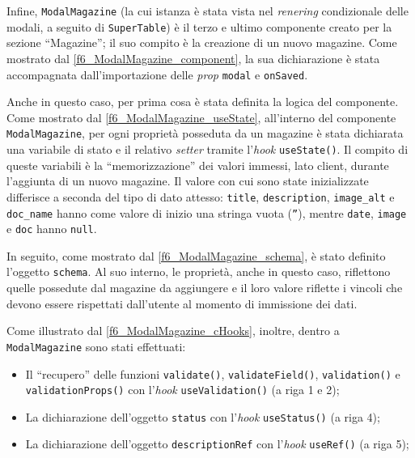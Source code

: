 

Infine, \texttt{ModalMagazine} (la cui istanza è stata vista nel \textit{renering} condizionale delle modali, a seguito di \texttt{SuperTable}) è il terzo e ultimo componente creato per la sezione “Magazine”; il suo compito è la creazione di un nuovo magazine. Come mostrato dal \autoref{f6_ModalMagazine_component}, la sua dichiarazione è stata accompagnata dall'importazione delle \textit{prop} \texttt{modal} e \texttt{onSaved}.


Anche in questo caso, per prima cosa è stata definita la logica del componente. Come mostrato dal \autoref{f6_ModalMagazine_useState}, all'interno del componente \texttt{ModalMagazine}, per ogni proprietà posseduta da un magazine è stata dichiarata una variabile di stato e il relativo \textit{setter} tramite l'\textit{hook} \texttt{useState()}. Il compito di queste variabili è la “memorizzazione” dei valori immessi, lato client, durante l'aggiunta di un nuovo magazine. Il valore con cui sono state inizializzate differisce a seconda del tipo di dato attesso: \texttt{title}, \texttt{description}, \texttt{image\_alt} e \texttt{doc\_name} hanno come valore di inizio una stringa vuota (\texttt{''}), mentre \texttt{date}, \texttt{image} e \texttt{doc} hanno \texttt{null}.


In seguito, come mostrato dal \autoref{f6_ModalMagazine_schema}, è stato definito l'oggetto \texttt{schema}. Al suo interno, le proprietà, anche in questo caso, riflettono quelle possedute dal magazine da aggiungere e il loro valore riflette i vincoli che devono essere rispettati dall'utente al momento di immissione dei dati.


Come illustrato dal \autoref{f6_ModalMagazine_cHooks}, inoltre, dentro a \texttt{ModalMagazine} sono stati effettuati:
\begin{itemize}
    \item Il “recupero” delle funzioni \texttt{validate()}, \texttt{validateField()}, \texttt{validation()} e \\\texttt{validationProps()} con l'\textit{hook} \texttt{useValidation()} (a riga 1 e 2);
    
    \item La dichiarazione dell'oggetto \texttt{status} con l'\textit{hook} \texttt{useStatus()} (a riga 4);
    
    \item La dichiarazione dell'oggetto \texttt{descriptionRef} con l'\textit{hook} \texttt{useRef()} (a riga 5);
\end{itemize}


